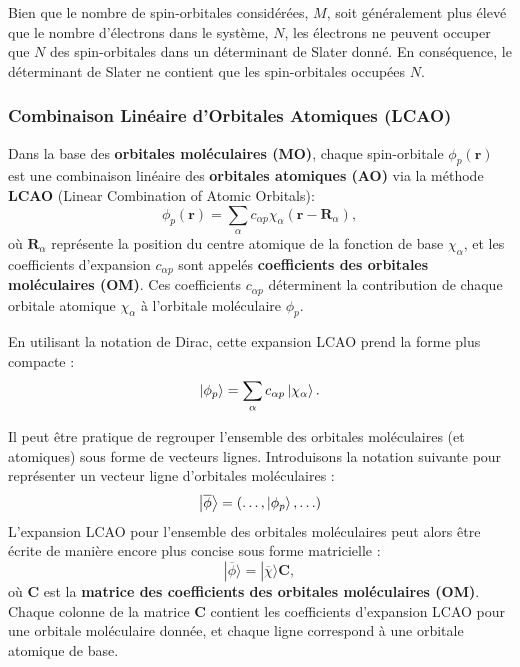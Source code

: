 \documentclass[12pt,a4paper]{article} %
\numberwithin{equation}{section} %
\numberwithin{figure}{section} %
\numberwithin{table}{section} %
\begin{document}
Bien que le nombre de spin-orbitales considérées, $M$, soit généralement plus élevé que le nombre d'électrons dans le système, $N$, les électrons ne peuvent occuper que $N$ des spin-orbitales dans un déterminant de Slater donné. En conséquence, le déterminant de Slater ne contient que les spin-orbitales occupées $N$.


\subsubsection{Combinaison Linéaire d'Orbitales Atomiques (LCAO)}


Dans la base des \textbf{orbitales moléculaires (MO)}, chaque spin-orbitale $\phi_p(\mathbf{r})$ est une combinaison linéaire des \textbf{orbitales atomiques (AO)} via la méthode \textbf{LCAO} (Linear Combination of Atomic Orbitals):
\begin{equation}
\phi_p(\mathbf{r}) = \sum_\alpha c_{\alpha p} \chi_\alpha(\mathbf{r} - \mathbf{R}_\alpha),
\end{equation}
où $\mathbf{R}_\alpha$ représente la position du centre atomique de la fonction de base $\chi_\alpha$, et les coefficients d'expansion $c_{\alpha p}$ sont appelés \textbf{coefficients des orbitales moléculaires (OM)}. Ces coefficients $c_{\alpha p}$ déterminent la contribution de chaque orbitale atomique $\chi_\alpha$ à l'orbitale moléculaire $\phi_p$.

En utilisant la notation de Dirac, cette expansion LCAO prend la forme plus compacte :
\begin{equation}
  \ket{\phi_p} = \sum_\alpha c_{\alpha p}\ket{\chi_\alpha}.
\end{equation}

Il peut être pratique de regrouper l'ensemble des orbitales moléculaires (et atomiques) sous forme de vecteurs lignes.  Introduisons la notation suivante pour représenter un vecteur ligne d'orbitales moléculaires :
\begin{equation}
    \ket{\overline{\phi}} = (\ldots, \ket{\phi_p}, \ldots)
\end{equation}
L'expansion LCAO pour l'ensemble des orbitales moléculaires peut alors être écrite de manière encore plus concise sous forme matricielle :
\begin{equation}
    | \overline{\phi} \rangle = | \overline{\chi} \rangle \mathbf{C},
\end{equation}
où $\mathbf{C}$ est la \textbf{matrice des coefficients des orbitales moléculaires (OM)}. Chaque colonne de la matrice $\mathbf{C}$ contient les coefficients d'expansion LCAO pour une orbitale moléculaire donnée, et chaque ligne correspond à une orbitale atomique de base.
\end{document}
